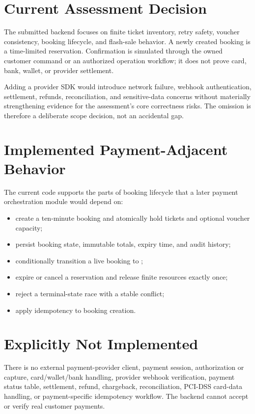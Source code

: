 \label{ch:payment-scope}
\section{Current Assessment Decision}
\begin{decisionbox}
The submitted backend focuses on finite ticket inventory, retry safety,
voucher consistency, booking lifecycle, and flash-sale behavior. A newly
created booking is a time-limited reservation. Confirmation is simulated
through the owned customer command or an authorized operation workflow; it does
not prove card, bank, wallet, or provider settlement.
\end{decisionbox}

Adding a provider SDK would introduce network failure, webhook authentication,
settlement, refunds, reconciliation, and sensitive-data concerns without
materially strengthening evidence for the assessment's core correctness risks.
The omission is therefore a deliberate scope decision, not an accidental gap.

\section{Implemented Payment-Adjacent Behavior}
The current code supports the parts of booking lifecycle that a later payment
orchestration module would depend on:
\begin{itemize}
  \item create a ten-minute  booking and atomically hold tickets and optional voucher capacity;
  \item persist booking state, immutable totals, expiry time, and audit history;
  \item conditionally transition a live  booking to ;
  \item expire or cancel a reservation and release finite resources exactly once;
  \item reject a terminal-state race with a stable conflict;
  \item apply idempotency to booking creation.
\end{itemize}

\section{Explicitly Not Implemented}
There is no external payment-provider client, payment session, authorization or
capture, card/wallet/bank handling, provider webhook verification, payment
status table, settlement, refund, chargeback, reconciliation, PCI-DSS card-data
handling, or payment-specific idempotency workflow. The backend cannot accept
or verify real customer payments.

